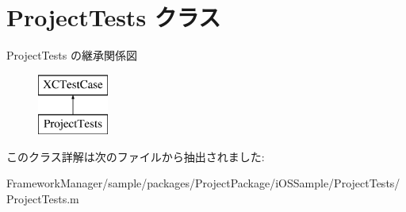 \hypertarget{interface_project_tests}{}\section{Project\+Tests クラス}
\label{interface_project_tests}
Project\+Tests の継承関係図\begin{figure}[H]
\begin{center}
\leavevmode
\includegraphics[height=2.000000cm]{interface_project_tests}
\end{center}
\end{figure}


このクラス詳解は次のファイルから抽出されました\+:\begin{DoxyCompactItemize}
\item 
Framework\+Manager/sample/packages/\+Project\+Package/i\+O\+S\+Sample/\+Project\+Tests/Project\+Tests.\+m\end{DoxyCompactItemize}
